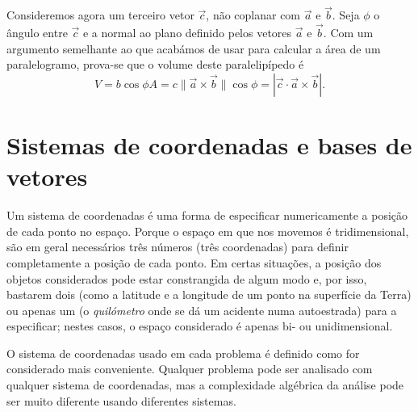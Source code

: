 Consideremos agora um terceiro vetor $\vec c$, não coplanar com $\vec a$ e $\vec
b$. Seja $\phi$ o ângulo entre $\vec c$ e a normal ao plano definido pelos
vetores $\vec a$ e $\vec b$. Com um argumento semelhante ao que acabámos de
usar para calcular a área de um paralelogramo, prova-se que o volume deste
paralelipípedo é
\begin{equation}
V=b\cos\phi A = c \|\vec a\times\vec b\| \cos\phi=
\left|\vec c\cdot\vec a\times\vec b\right|.
\end{equation}

\section{Sistemas de coordenadas e bases de vetores}
Um sistema de coordenadas é uma forma de especificar numericamente a posição de
cada ponto no espaço. Porque o espaço em que nos movemos é tridimensional, são
em geral necessários três números (três coordenadas) para definir completamente
a posição de cada ponto. Em certas situações, a posição dos objetos considerados
pode estar constrangida de algum modo e, por isso, bastarem dois (como a
latitude e a longitude de um ponto na superfície da Terra) ou apenas um (o
\emph{quilómetro} onde se dá um acidente numa autoestrada) para a especificar;
nestes casos, o espaço considerado é apenas bi- ou unidimensional.

O sistema de coordenadas usado em cada problema é definido como for considerado
mais conveniente. Qualquer problema pode ser analisado com qualquer sistema de
coordenadas, mas a complexidade algébrica da análise pode ser muito diferente
usando diferentes sistemas.

